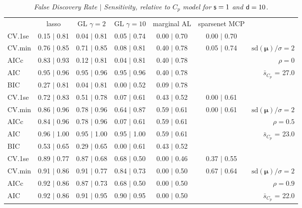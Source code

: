\documentclass[12pt]{article}
\newcommand{\mr}[1]{\mathrm{#1}}
\newcommand{\bm}[1]{\mathbf{#1}}
\begin{document}
\begin{table}[p]\vspace{-.5cm}
\caption[l]{\label{sens}\it False Discovery Rate $\mid$ Sensitivity, relative to $C_p$ model  for ${\sf s}=1$ and ${\sf d}=10$.}
\vspace{-.5cm}
\small{}
\begin{center}
\begin{tabular}{l*{5}{c}|r}
 & lasso & GL $\gamma=2$ & GL $\gamma=10$ & marginal AL & sparsenet MCP  & \\
 \cline{1-7}
CV.1se & 0.15 $\mid$ 0.81 & 0.04 $\mid$ 0.81 & 0.05 $\mid$ 0.74 & 0.00 $\mid$ 0.70 & 0.00 $\mid$ 0.70 &\\
CV.min & 0.76 $\mid$ 0.85 & 0.71 $\mid$ 0.85 & 0.08 $\mid$ 0.81 & 0.40 $\mid$ 0.78 & 0.05 $\mid$ 0.74 &  $\mr{sd}(\bm{\mu})/\sigma=2$ \\
AICc & 0.83 $\mid$ 0.93 & 0.12 $\mid$ 0.81 & 0.04 $\mid$ 0.81 & 0.40 $\mid$ 0.78 & & $\rho=0$ \\
AIC & 0.95 $\mid$ 0.96 & 0.95 $\mid$ 0.96 & 0.95 $\mid$ 0.96 & 0.40 $\mid$ 0.78 & & \multirow{2}{*}{$\bar{s}_{C_p}$ = 27.0} \\
BIC & 0.27 $\mid$ 0.81 & 0.04 $\mid$ 0.81 & 0.00 $\mid$ 0.52 & 0.09 $\mid$ 0.78 & & \\
 \hline 
CV.1se & 0.72 $\mid$ 0.83 & 0.51 $\mid$ 0.78 & 0.07 $\mid$ 0.61 & 0.43 $\mid$ 0.52 & 0.00 $\mid$ 0.61 &\\
CV.min & 0.86 $\mid$ 0.96 & 0.78 $\mid$ 0.96 & 0.64 $\mid$ 0.87 & 0.59 $\mid$ 0.61 & 0.00 $\mid$ 0.61 &  $\mr{sd}(\bm{\mu})/\sigma=2$ \\
AICc & 0.84 $\mid$ 0.96 & 0.78 $\mid$ 0.96 & 0.07 $\mid$ 0.61 & 0.59 $\mid$ 0.61 & & $\rho=0.5$ \\
AIC & 0.96 $\mid$ 1.00 & 0.95 $\mid$ 1.00 & 0.95 $\mid$ 1.00 & 0.59 $\mid$ 0.61 & & \multirow{2}{*}{$\bar{s}_{C_p}$ = 23.0} \\
BIC & 0.53 $\mid$ 0.65 & 0.29 $\mid$ 0.65 & 0.00 $\mid$ 0.61 & 0.43 $\mid$ 0.52 & & \\
 \hline 
CV.1se & 0.89 $\mid$ 0.77 & 0.87 $\mid$ 0.68 & 0.68 $\mid$ 0.50 & 0.00 $\mid$ 0.46 & 0.37 $\mid$ 0.55 &\\
CV.min & 0.91 $\mid$ 0.86 & 0.91 $\mid$ 0.77 & 0.84 $\mid$ 0.73 & 0.00 $\mid$ 0.50 & 0.67 $\mid$ 0.64 &  $\mr{sd}(\bm{\mu})/\sigma=2$ \\
AICc & 0.92 $\mid$ 0.86 & 0.87 $\mid$ 0.73 & 0.68 $\mid$ 0.50 & 0.00 $\mid$ 0.50 & & $\rho=0.9$ \\
AIC & 0.92 $\mid$ 0.86 & 0.91 $\mid$ 0.95 & 0.90 $\mid$ 0.95 & 0.00 $\mid$ 0.50 & & \multirow{2}{*}{$\bar{s}_{C_p}$ = 22.0} \\

\end{tabular}
\end{center}
\end{table}
\end{document}
